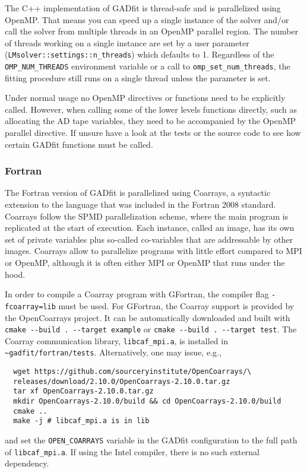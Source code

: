 \documentclass{article}
\begin{document}
The C++ implementation of GADfit is thread-safe and is parallelized using OpenMP. That means you can speed up a single instance of the solver and/or call the solver from multiple threads in an OpenMP parallel region. The number of threads working on a single instance are set by a user parameter\\
(\verb+LMsolver::settings::n_threads+) which defaults to 1. Regardless of the \verb+OMP_NUM_THREADS+ environment variable or a call to \verb+omp_set_num_threads+, the fitting procedure still runs on a single thread unless the parameter is set.

Under normal usage no OpenMP directives or functions need to be explicitly called. However, when calling some of the lower levels functions directly, such as allocating the AD tape variables, they need to be accompanied by the OpenMP parallel directive. If unsure have a look at the tests or the source code to see how certain GADfit functions must be called.

\subsubsection{\label{sec:parallelism_fortran}Fortran}

The Fortran version of GADfit is parallelized using Coarrays, a syntactic extension to the language that was included in the Fortran 2008 standard. Coarrays follow the SPMD parallelization scheme, where the main program is replicated at the start of execution. Each instance, called an image, has its own set of private variables plus so-called co-variables that are addressable by other images. Coarrays allow to parallelize programs with little effort compared to MPI or OpenMP, although it is often either MPI or OpenMP that runs under the hood.

In order to compile a Coarray program with GFortran, the compiler flag \texttt{-fcoarray=lib} must be used. For GFortran, the Coarray support is provided by the OpenCoarrays project. It can be automatically downloaded and built with \verb+cmake --build . --target example+ or \verb+cmake --build . --target test+. The Coarray communication library, \verb+libcaf_mpi.a+, is installed in \\
\verb+~gadfit/fortran/tests+. Alternatively, one may issue, e.g.,
\begin{verbatim}
  wget https://github.com/sourceryinstitute/OpenCoarrays/\
  releases/download/2.10.0/OpenCoarrays-2.10.0.tar.gz
  tar xf OpenCoarrays-2.10.0.tar.gz
  mkdir OpenCoarrays-2.10.0/build && cd OpenCoarrays-2.10.0/build
  cmake ..
  make -j # libcaf_mpi.a is in lib
\end{verbatim}
and set the \verb+OPEN_COARRAYS+ variable in the GADfit configuration to the full path of \verb+libcaf_mpi.a+. If using the Intel compiler, there is no such external dependency.
\end{document}

